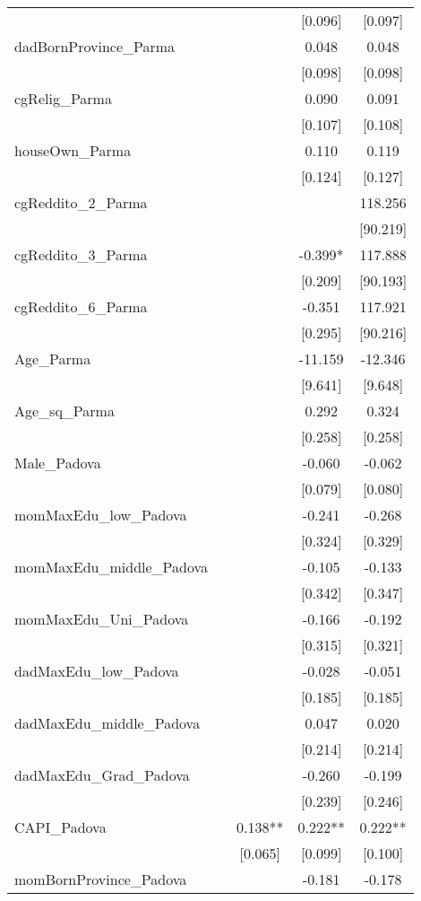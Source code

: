 \documentclass[]{article}
\begin{document}
\begin{tabular}{lcccc}
 &  &  & [0.096] & [0.097] \\
dadBornProvince\_Parma &  &  & 0.048 & 0.048 \\
 &  &  & [0.098] & [0.098] \\
cgRelig\_Parma &  &  & 0.090 & 0.091 \\
 &  &  & [0.107] & [0.108] \\
houseOwn\_Parma &  &  & 0.110 & 0.119 \\
 &  &  & [0.124] & [0.127] \\
cgReddito\_2\_Parma &  &  &  & 118.256 \\
 &  &  &  & [90.219] \\
cgReddito\_3\_Parma &  &  & -0.399* & 117.888 \\
 &  &  & [0.209] & [90.193] \\
cgReddito\_6\_Parma &  &  & -0.351 & 117.921 \\
 &  &  & [0.295] & [90.216] \\
Age\_Parma &  &  & -11.159 & -12.346 \\
 &  &  & [9.641] & [9.648] \\
Age\_sq\_Parma &  &  & 0.292 & 0.324 \\
 &  &  & [0.258] & [0.258] \\
Male\_Padova &  &  & -0.060 & -0.062 \\
 &  &  & [0.079] & [0.080] \\
momMaxEdu\_low\_Padova &  &  & -0.241 & -0.268 \\
 &  &  & [0.324] & [0.329] \\
momMaxEdu\_middle\_Padova &  &  & -0.105 & -0.133 \\
 &  &  & [0.342] & [0.347] \\
momMaxEdu\_Uni\_Padova &  &  & -0.166 & -0.192 \\
 &  &  & [0.315] & [0.321] \\
dadMaxEdu\_low\_Padova &  &  & -0.028 & -0.051 \\
 &  &  & [0.185] & [0.185] \\
dadMaxEdu\_middle\_Padova &  &  & 0.047 & 0.020 \\
 &  &  & [0.214] & [0.214] \\
dadMaxEdu\_Grad\_Padova &  &  & -0.260 & -0.199 \\
 &  &  & [0.239] & [0.246] \\
CAPI\_Padova &  & 0.138** & 0.222** & 0.222** \\
 &  & [0.065] & [0.099] & [0.100] \\
momBornProvince\_Padova &  &  & -0.181 & -0.178 \\

\end{tabular}
\end{document}
